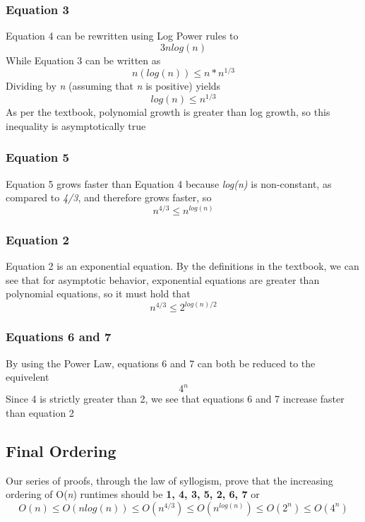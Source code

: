 \documentclass[titlepage]{article}
\numberwithin{equation}{subsection}
\begin{document}
\subsubsection{Equation 3}
    Equation 4 can be rewritten using Log Power rules to 
    \begin{equation}
        3nlog(n)
    \end{equation}
    While Equation 3 can be written as
    \begin{equation}
        n(log(n)) \leq n*n^{1/3}
    \end{equation}
    Dividing by \textit{n} (assuming that \textit{n} is positive) yields 
    \begin{equation}
        log(n) \leq n^{1/3}
    \end{equation}
    As per the textbook, polynomial growth is greater than log growth, so this 
    inequality is asymptotically true
\subsubsection{Equation 5}
    Equation 5 grows faster than Equation 4 because \textit{log(n)} is
    non-constant, as compared to \textit{4/3}, and therefore grows faster, so
    \begin{equation}
        n^{4/3} \leq n^{log(n)}
    \end{equation}
\subsubsection{Equation 2}
    Equation 2 is an exponential equation.
    By the definitions in the textbook, we can see that for asymptotic behavior,
    exponential equations are greater than polynomial equations, so it must hold that
    \begin{equation}
        n^{4/3} \leq 2^{log(n)/2}
    \end{equation}
\subsubsection{Equations 6 and 7}
    By using the Power Law, equations 6 and 7 can both be reduced to the equivelent
    \begin{equation}
        4^n
    \end{equation}
    Since 4 is strictly greater than 2, we see that equations 6 and 7 increase
    faster than equation 2
\subsection{Final Ordering}
Our series of proofs, through the law of syllogism, prove that the increasing 
ordering of O(\textit{n}) runtimes should be 
\textbf{1, 4, 3, 5, 2, 6, 7} or
\begin{equation}
    O(n) \leq O(nlog(n)) \leq O(n^{4/3}) \leq O(n^{log(n)}) \leq  O(2^n) \leq O(4^n)
\end{equation}
\end{document}
